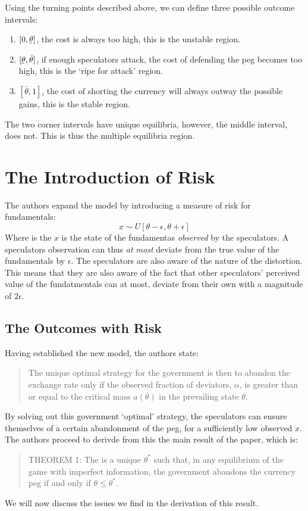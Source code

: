 \begin{refsection}
Using the turning points described above, we can define three possible outcome intervals:
\begin{enumerate}
	\item $[0, \underaccent{\bar}{\theta}]$, the cost is always too high, this is the unstable region.
	\item $[\underaccent{\bar}{\theta}, \bar{\theta}]$, if enough speculators attack, the cost of defending the peg becomes too high,
	this is the `ripe for attack' region.
	\item $[\bar{\theta}, 1]$, the cost of shorting the currency will always outway the possible gains,
	this is the stable region.
\end{enumerate}
The two corner intervals have unique equilibria, however, the middle interval, does not. This is thus the multiple equilibria region.


\section{The Introduction of Risk}
The authors expand the model by introducing a measure of risk for fundamentals:
\begin{equation}
x \sim U[\theta - \epsilon, \theta + \epsilon]
\end{equation}
Where is the $x$ is the state of the fundamentas \textit{observed} by the speculators.
A speculators observation can thus \textit{at most} deviate from the true value of the fundamentals by $\epsilon$.
The speculators are also aware of the nature of the distortion.
This means that they are also aware of the fact that other speculators' perceived value of the fundatmentals can at most,
deviate from their own with a magnitude of $2\epsilon$.

\subsection{The Outcomes with Risk}
\label{unc:results}
Having established the new model, the authors state:
\begin{quotation}
	The unique optimal strategy for the government is then to abandon the exchange rate only if the observed fraction of deviators, $\alpha$, is greater than or equal to the critical mass $a(\theta)$ in the prevailing state $\theta$.\parencite[p.~591]{morris1998unique}
\end{quotation}
By solving out this government `optimal' strategy,
the speculators can ensure themselves of a certain abandonment of the peg,
for a sufficiently low observed $x$.
The authors proceed to derivde from this the main result of the paper, which is:
\begin{quotation}
	THEOREM 1: The is a unique $\theta^*$ such that,
	in any equilibrium of the game with imperfect information,
	the government abandons the currency peg if and only if $\theta \leq \theta^*$. \parencite[p.~592]{morris1998unique}
\end{quotation}
We will now discuss the issues we find in the derivation of this result.



\end{refsection}
